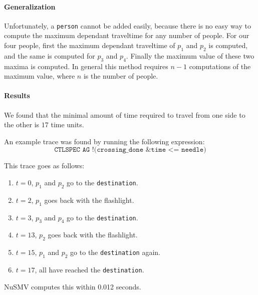 \documentclass[12pt]{article}
\begin{document}
\paragraph{Generalization}
Unfortunately, a \texttt{person} cannot be added easily, because there is no easy way to compute the maximum dependant traveltime for any number of people.
For our four people, first the maximum dependant traveltime of $p_1$ and $p_2$ is computed, and the same is computed for $p_3$ and $p_4$.
Finally the maximum value of these two maxima is computed.
In general this method requires $n-1$ computations of the maximum value, where $n$ is the number of people.

\paragraph{Results}
We found that the minimal amount of time required to travel from one side to the other is $17$ time units.

An example trace was found by running the following expression:
\[ \texttt{CTLSPEC AG !(crossing\_done \& time <= needle)} \]

This trace goes as follows:
\begin{enumerate}
\item $t = 0$, $p_1$ and $p_2$ go to the \texttt{destination}.
\item $t = 2$, $p_1$ goes back with the flashlight.
\item $t = 3$, $p_3$ and $p_4$ go to the \texttt{destination}.
\item $t = 13$, $p_2$ goes back with the flashlight.
\item $t = 15$, $p_1$ and $p_2$ go to the \texttt{destination} again.
\item $t = 17$, all have reached the \texttt{destination}.
\end{enumerate}

NuSMV computes this within 0.012 seconds.

{}

\end{document}
